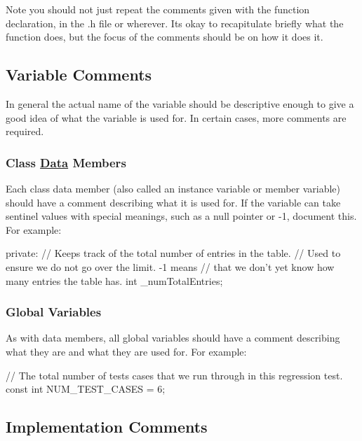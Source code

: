 Note you should not just repeat the comments given with the function declaration, in the .h file or wherever. It\textquotesingle{}s okay to recapitulate briefly what the function does, but the focus of the comments should be on how it does it.

\subsection*{Variable Comments}

In general the actual name of the variable should be descriptive enough to give a good idea of what the variable is used for. In certain cases, more comments are required.

\subsubsection*{Class \hyperlink{classData}{Data} Members}

Each class data member (also called an instance variable or member variable) should have a comment describing what it is used for. If the variable can take sentinel values with special meanings, such as a null pointer or -\/1, document this. For example\+:


\begin{DoxyCode}
\textcolor{keyword}{private}:
 \textcolor{comment}{// Keeps track of the total number of entries in the table.}
 \textcolor{comment}{// Used to ensure we do not go over the limit. -1 means}
 \textcolor{comment}{// that we don't yet know how many entries the table has.}
 \textcolor{keywordtype}{int} \_numTotalEntries;
\end{DoxyCode}


\subsubsection*{Global Variables}

As with data members, all global variables should have a comment describing what they are and what they are used for. For example\+:


\begin{DoxyCode}
\textcolor{comment}{// The total number of tests cases that we run through in this regression test.}
\textcolor{keyword}{const} \textcolor{keywordtype}{int} NUM\_TEST\_CASES = 6;
\end{DoxyCode}


\subsection*{Implementation Comments}

